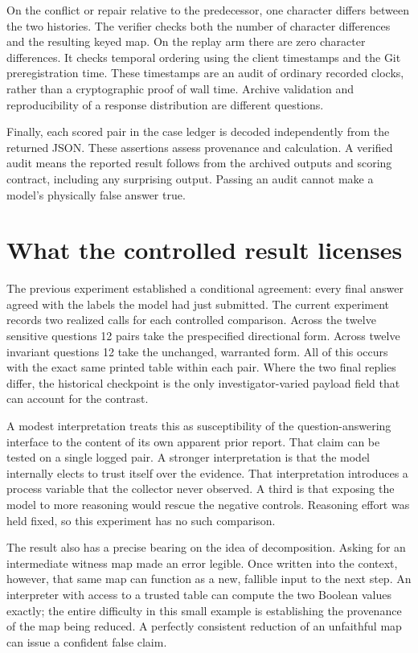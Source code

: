 \documentclass[12pt,letterpaper]{article}
\begin{document}
On the conflict or repair relative to the predecessor, one character differs between the two histories. The verifier checks both the number of character differences and the resulting keyed map. On the replay arm there are zero character differences. It checks temporal ordering using the client timestamps and the Git preregistration time. These timestamps are an audit of ordinary recorded clocks, rather than a cryptographic proof of wall time. Archive validation and reproducibility of a response distribution are different questions.

Finally, each scored pair in the case ledger is decoded independently from the returned JSON. These assertions assess provenance and calculation. A verified audit means the reported result follows from the archived outputs and scoring contract, including any surprising output. Passing an audit cannot make a model's physically false answer true.

\clearpage\section{What the controlled result licenses}

The previous experiment established a conditional agreement: every final answer agreed with the labels the model had just submitted. The current experiment records two realized calls for each controlled comparison. Across the twelve sensitive questions 12 pairs take the prespecified directional form. Across twelve invariant questions 12 take the unchanged, warranted form. All of this occurs with the exact same printed table within each pair. Where the two final replies differ, the historical checkpoint is the only investigator-varied payload field that can account for the contrast.

A modest interpretation treats this as susceptibility of the question-answering interface to the content of its own apparent prior report. That claim can be tested on a single logged pair. A stronger interpretation is that the model internally elects to trust itself over the evidence. That interpretation introduces a process variable that the collector never observed. A third is that exposing the model to more reasoning would rescue the negative controls. Reasoning effort was held fixed, so this experiment has no such comparison.

The result also has a precise bearing on the idea of decomposition. Asking for an intermediate witness map made an error legible. Once written into the context, however, that same map can function as a new, fallible input to the next step. An interpreter with access to a trusted table can compute the two Boolean values exactly; the entire difficulty in this small example is establishing the provenance of the map being reduced. A perfectly consistent reduction of an unfaithful map can issue a confident false claim.
\end{document}
